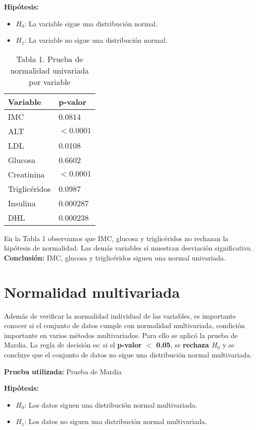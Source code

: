 \documentclass[12pt]{report}
\begin{document}
\textbf{Hipótesis:}
\begin{itemize}
    \item $H_0$: La variable sigue una distribución normal.
    \item $H_1$: La variable no sigue una distribución normal.
\end{itemize}

\begin{table}[H]
\centering
\begin{tabular}{ll}
\toprule
\textbf{Variable} & \textbf{p-valor} \\
\midrule
IMC & 0.0814 \\
ALT & $< 0.0001$ \\
LDL & 0.0108 \\
Glucosa & 0.6602 \\
Creatinina & $< 0.0001$ \\
Triglicéridos & 0.0987 \\
Insulina & 0.000287 \\
DHL & 0.000238 \\
\bottomrule
\end{tabular}
\caption{Tabla 1. Prueba de normalidad univariada por variable}
\end{table}

\noindent En la Tabla 1 observamos que IMC, glucosa y triglicéridos no rechazan la hipótesis de normalidad. Las demás variables sí muestran desviación significativa. \\\textbf{Conclusión:} IMC, glucosa y triglicéridos siguen una normal univariada.

\section{Normalidad multivariada}
Además de verificar la normalidad individual de las variables, es importante conocer si el conjunto de datos cumple con normalidad multivariada, condición importante en varios métodos multivariados. Para ello se aplicó la prueba de Mardia.\newline
La regla de decisión es: si el \textbf{p-valor $<$ 0.05}, se \textbf{rechaza $H_0$} y se concluye que el conjunto de datos no sigue una distribución normal multivariada.

\textbf{Prueba utilizada:} Prueba de Mardia

\textbf{Hipótesis:}
\begin{itemize}
    \item $H_0$: Los datos siguen una distribución normal multivariada.
    \item $H_1$: Los datos no siguen una distribución normal multivariada.
\end{itemize}
\end{document}

